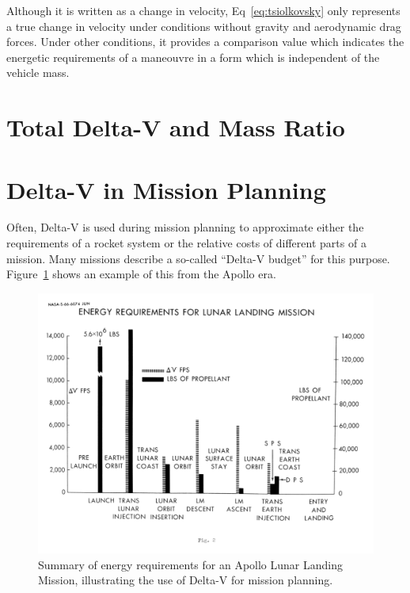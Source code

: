 \documentclass[12pt,openany]{book}
\begin{document}
Although it is written as a change in velocity, Eq~\ref{eq:tsiolkovsky} only represents a true change in velocity under conditions without gravity and aerodynamic drag forces. Under other conditions, it provides a comparison value which indicates the energetic requirements of a maneouvre in a form which is independent of the vehicle mass.

\section{Total Delta-V and Mass Ratio}



\section{Delta-V in Mission Planning}

Often, Delta-V is used during mission planning to approximate either the requirements of a rocket system or the relative costs of different parts of a mission. Many missions describe a so-called ``Delta-V budget'' for this purpose. Figure~\ref{fig:apollo-delta-v} shows an example of this from the Apollo era.
\begin{figure}
  \centering
  \includegraphics[width=\textwidth]{images/apollo-delta-v.png}
  \caption{Summary of energy requirements for an Apollo Lunar Landing Mission, illustrating the use of Delta-V for mission planning.\cite{maynard1966}}
  \label{fig:apollo-delta-v}
\end{figure}

\printunsrtglossary[type=symbols,style=long]

\clearpage{}
{}


\end{document}
